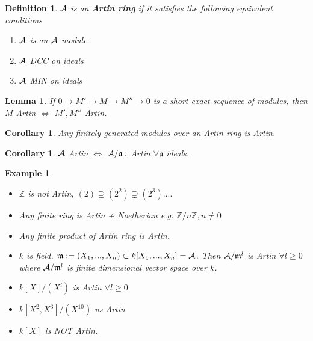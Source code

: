 \documentclass[11pt]{article}
\newtheorem{lemma}[thm]{Lemma}
\newtheorem{cor}[thm]{Corollary}
\newtheorem{dfn}[thm]{Definition}
\newtheorem{ex}[thm]{Example}
\newcommand{\intg}{\mathbb Z}
\newcommand{\sca}{{\mathfrak a}}
\newcommand{\scm}{{\mathfrak m}}
\newcommand{\cala}{{\cal A}}
\newcommand{\lrta}{\longrightarrow}
\newcommand{\Llrta}{\Longleftrightarrow}
\begin{document}
\begin{dfn}
$\cala$ is an \textbf{Artin ring } if it satisfies the following equivalent conditions
\begin{enumerate}[label=(\roman*)]
\item $\cala$ is an $\cala$-module
\item $\cala$ DCC on ideals
\item $\cala$ MIN on ideals
\end{enumerate}
\end{dfn}

\begin{lemma}\label{lem:SES_Artin}
If $0\lrta M'\lrta M\lrta M''\lrta 0$ is a short exact sequence of modules, then $M$ Artin $\Llrta$ $M', M''$ Artin.
\end{lemma}
\begin{cor}
Any finitely generated modules over an Artin ring is Artin.
\end{cor}
\begin{cor}
$\cala$ Artin $\Llrta $ $\cala/\sca:$ Artin $\forall \sca$ ideals.
\end{cor}

\begin{ex}\ 
\begin{itemize}
\item $\intg $ is not Artin,
$(2)\supsetneq (2^2)\supsetneq (2^3)....$
\item Any finite ring is Artin + Noetherian e.g. $\intg/n\intg,n\neq 0$
\item Any finite product of Artin ring is Artin.
\item $k$ is field, $\scm:=(X_1,...,X_n)\subset k[X_1,...,X_n]=\cala$. Then $\cala/\scm^l$ is Artin $\forall l\geq 0$ where $\cala/\scm^l$ is finite dimensional vector space over $k$.
\item $k[X]/(X^l)$ is Artin $\forall l\geq 0$
\item $k[X^2,X^3]/(X^{10})$ us Artin
\item $k[X]$ is NOT Artin.
\end{itemize}
\end{ex}
\end{document}
